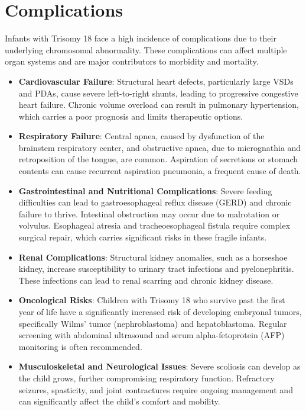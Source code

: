 \section*{Complications}
Infants with Trisomy 18 face a high incidence of complications due to their underlying chromosomal abnormality. These complications can affect multiple organ systems and are major contributors to morbidity and mortality.
\begin{itemize}
    \item \textbf{Cardiovascular Failure}: Structural heart defects, particularly large VSDs and PDAs, cause severe left-to-right shunts, leading to progressive congestive heart failure. Chronic volume overload can result in pulmonary hypertension, which carries a poor prognosis and limits therapeutic options.
    \item \textbf{Respiratory Failure}: Central apnea, caused by dysfunction of the brainstem respiratory center, and obstructive apnea, due to micrognathia and retroposition of the tongue, are common. Aspiration of secretions or stomach contents can cause recurrent aspiration pneumonia, a frequent cause of death.
    \item \textbf{Gastrointestinal and Nutritional Complications}: Severe feeding difficulties can lead to gastroesophageal reflux disease (GERD) and chronic failure to thrive. Intestinal obstruction may occur due to malrotation or volvulus. Esophageal atresia and tracheoesophageal fistula require complex surgical repair, which carries significant risks in these fragile infants.
    \item \textbf{Renal Complications}: Structural kidney anomalies, such as a horseshoe kidney, increase susceptibility to urinary tract infections and pyelonephritis. These infections can lead to renal scarring and chronic kidney disease.
    \item \textbf{Oncological Risks}: Children with Trisomy 18 who survive past the first year of life have a significantly increased risk of developing embryonal tumors, specifically Wilms' tumor (nephroblastoma) and hepatoblastoma. Regular screening with abdominal ultrasound and serum alpha-fetoprotein (AFP) monitoring is often recommended.
    \item \textbf{Musculoskeletal and Neurological Issues}: Severe scoliosis can develop as the child grows, further compromising respiratory function. Refractory seizures, spasticity, and joint contractures require ongoing management and can significantly affect the child's comfort and mobility.
\end{itemize}

